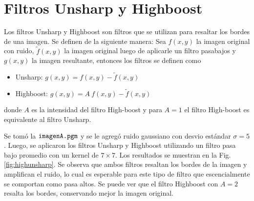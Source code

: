 \documentclass[letterpaper,12pt]{article}
\theoremstyle{plain}
\begin{document}
\section{Filtros Unsharp y Highboost\label{sec:ej6}}

\vspace{0.3cm}

Los filtros Unsharp y Highboost son filtros que se utilizan para resaltar los bordes de una imagen. Se definen de la siguiente manera: Sea $f(x,y)$ la imagen original con ruido, $\tilde{f}(x,y)$ la imagen original luego de aplicarle un filtro pasabajos y $g(x,y)$ la imagen resultante, entonces los filtros se definen como
\begin{itemize}
    \item Unsharp: $g(x,y) = f(x,y) - \tilde{f}(x,y)$
    \item Highboost: $g(x,y) = A~f(x,y) - \tilde{f}(x,y)$
\end{itemize}
donde $A$ es la intensidad del filtro High-boost y para $A=1$ el filtro High-boost es equivalente al filtro Unsharp. 

Se tomó la $\verb|imagenA.pgm|$ y se le agregó ruido gaussiano con desvio estándar $\sigma = 5$. Luego, se aplicaron los filtros Unsharp y Highboost utilizando un filtro pasa bajo promedio con un kernel de $7\times7$. Los resultados se muestran en la Fig. \ref{fig:highunsharp}. Se observa que ambos filtros resaltan los bordes de la imagen y amplifican el ruido, lo cual es esperable para este tipo de filtro que escencialmente se comportan como pasa altos. Se puede ver que el filtro Highboost con $A=2$ resalta los bordes, conservando mejor la imagen original. 
\end{document}
